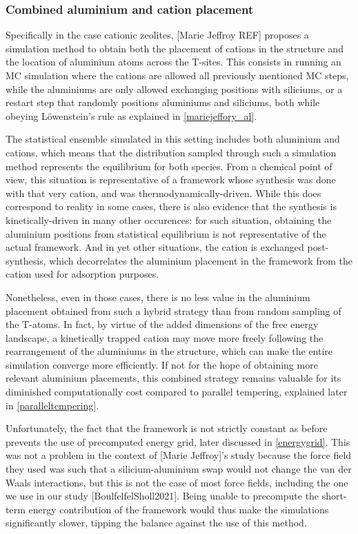 \documentclass[main.tex]{subfiles}
\begin{document}
\subsubsection{Combined aluminium and cation placement} %

Specifically in the case cationic zeolites, [Marie Jeffroy REF] proposes a simulation method to obtain both the placement of cations in the structure and the location of aluminium atoms across the T-sites. This consists in running an MC simulation where the cations are allowed all previously mentioned MC steps, while the aluminiums are only allowed exchanging positions with siliciums, or a restart step that randomly positions aluminiums and siliciums, both while obeying L\"owenstein's rule as explained in \cref{mariejeffory_al}.

The statistical ensemble simulated in this setting includes both aluminium and cations, which means that the distribution sampled through such a simulation method represents the equilibrium for both species. From a chemical point of view, this situation is representative of a framework whose synthesis was done with that very cation, and was thermodynamically-driven. While this does correspond to reality in some cases, there is also evidence that the synthesis is kinetically-driven in many other occurences: for such situation, obtaining the aluminium positions from statistical equilibrium is not representative of the actual framework. And in yet other situations, the cation is exchanged post-synthesis, which decorrelates the aluminium placement in the framework from the cation used for adsorption purposes.

Nonetheless, even in those cases, there is no less value in the aluminium placement obtained from such a hybrid strategy than from random sampling of the T-atoms. In fact, by virtue of the added dimensions of the free energy landscape, a kinetically trapped cation may move more freely following the rearrangement of the aluminiums in the structure, which can make the entire simulation converge more efficiently. If not for the hope of obtaining more relevant aluminium placements, this combined strategy remains valuable for its diminished computationally cost compared to parallel tempering, explained later in \cref{paralleltempering}.

Unfortunately, the fact that the framework is not strictly constant as before prevents the use of precomputed energy grid, later discussed in \cref{energygrid}. This was not a problem in the context of [Marie Jeffroy]'s study because the force field they used was such that a silicium-aluminium swap would not change the van der Waals interactions, but this is not the case of most force fields, including the one we use in our study [BoulfelfelSholl2021]. Being unable to precompute the short-term energy contribution of the framework would thus make the simulations significantly slower, tipping the balance against the use of this method.
\end{document}
